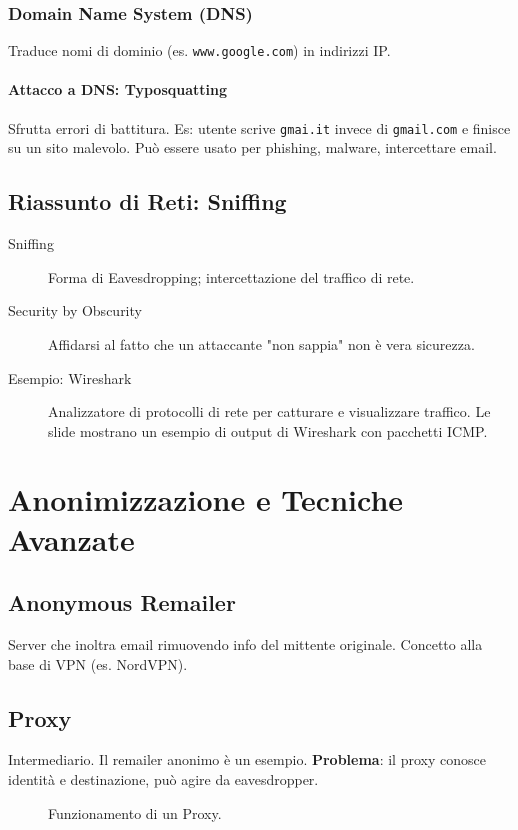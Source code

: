 \subsubsection{Domain Name System (DNS)}
Traduce nomi di dominio (es. \texttt{www.google.com}) in indirizzi IP.
\paragraph{Attacco a DNS: Typosquatting}
Sfrutta errori di battitura. Es: utente scrive \texttt{gmai.it} invece di \texttt{gmail.com} e finisce su un sito malevolo. Può essere usato per phishing, malware, intercettare email.

\subsection{Riassunto di Reti: Sniffing}
\begin{description}
    \item[Sniffing] Forma di Eavesdropping; intercettazione del traffico di rete.
    \item[Security by Obscurity] Affidarsi al fatto che un attaccante "non sappia" non è vera sicurezza.
    \item[Esempio: Wireshark] Analizzatore di protocolli di rete per catturare e visualizzare traffico. Le slide mostrano un esempio di output di Wireshark con pacchetti ICMP.
\end{description}

\section{Anonimizzazione e Tecniche Avanzate}

\subsection{Anonymous Remailer}
Server che inoltra email rimuovendo info del mittente originale. Concetto alla base di VPN (es. NordVPN).

\subsection{Proxy}
Intermediario. Il remailer anonimo è un esempio. \textbf{Problema}: il proxy conosce identità e destinazione, può agire da eavesdropper.
\begin{figure}[H]
    \centering
    \caption{Funzionamento di un Proxy.}
\end{figure}

